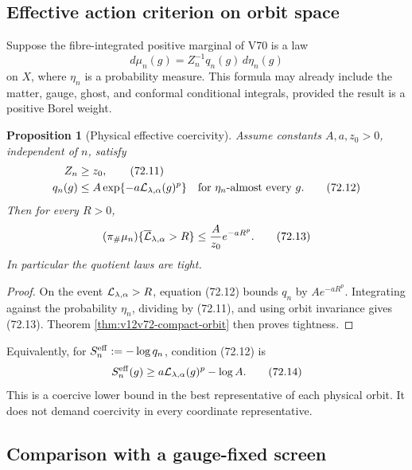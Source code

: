 \documentclass[11pt]{article}
\newtheorem{proposition}[theorem]{Proposition}
\theoremstyle{remark}
\begin{document}
\subsection{Effective action criterion on orbit space}

Suppose the fibre-integrated positive marginal of V70 is a law
\[
 d\mu_n(g)=Z_n^{-1}q_n(g)\,d\eta_n(g)                        \tag{72.10}
\]
on \(X\), where \(\eta_n\) is a probability measure.  This formula
may already include the matter, gauge, ghost, and conformal
conditional integrals, provided the result is a positive Borel
weight.

\begin{proposition}[Physical effective coercivity]
\label{prop:v12v72-effective}
Assume constants \(A,a,z_0>0\), independent of \(n\), satisfy
\begin{align}
 Z_n&\geq z_0,                                               \tag{72.11}\\
 q_n(g)&\leq
 A\exp\{-a{\cal L}_{\lambda,\alpha}(g)^p\}
 \quad\text{for }\eta_n\text{-almost every }g.              \tag{72.12}
\end{align}
Then for every \(R>0\),
\begin{equation}
 (\pi_\#\mu_n)\{
 \overline{\cal L}_{\lambda,\alpha}>R\}
 \leq {A\over z_0}e^{-aR^p}.                                \tag{72.13}
\end{equation}
In particular the quotient laws are tight.
\end{proposition}

\begin{proof}
On the event
\({\cal L}_{\lambda,\alpha}>R\), equation (72.12) bounds
\(q_n\) by \(Ae^{-aR^p}\).  Integrating against the probability
\(\eta_n\), dividing by (72.11), and using orbit invariance gives
(72.13).  Theorem \ref{thm:v12v72-compact-orbit} then proves
tightness.
\end{proof}

Equivalently, for
\(S_n^{\rm eff}:=-\log q_n\), condition (72.12) is
\begin{equation}
 S_n^{\rm eff}(g)
 \geq a{\cal L}_{\lambda,\alpha}(g)^p-\log A.                \tag{72.14}
\end{equation}
This is a coercive lower bound in the best representative of each
physical orbit.  It does not demand coercivity in every coordinate
representative.

\subsection{Comparison with a gauge-fixed screen}
\end{document}
